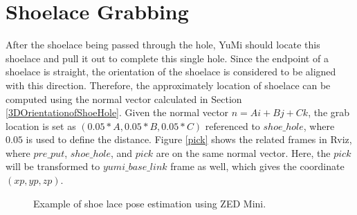\section{Shoelace Grabbing} \label{shoelacegrabbing}
After the shoelace being passed through the hole, YuMi should locate this shoelace and pull it out to complete this single hole. Since the endpoint of a shoelace is straight, the orientation of the shoelace is considered to be aligned with this direction. Therefore, the approximately location of shoelace can be computed using the normal vector calculated in Section \ref{3DOrientationofShoeHole}. Given the normal vector $n = Ai + Bj + Ck$, the grab location is set as $(0.05*A, 0.05*B, 0.05*C)$ referenced to $shoe\_hole$, where $0.05$ is used to define the distance. Figure \ref{pick} shows the related frames in Rviz, where $pre\_put$, $shoe\_hole$, and $pick$ are on the same normal vector. Here, the $pick$ will be transformed to $yumi\_base\_link$ frame as well, which gives the coordinate $(xp, yp, zp)$.

\begin{figure}[H]
\centering
{}
\caption{Example of shoe lace pose estimation using ZED Mini.}
\end{figure}

